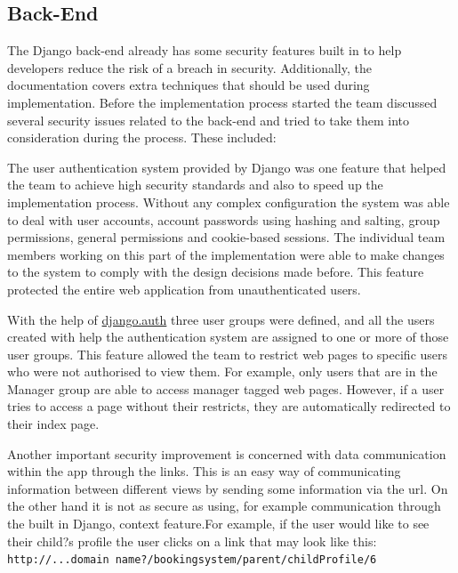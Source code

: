 \documentclass{l3proj}
\begin{document}
\subsection{Back-End}
The Django back-end already has some security features built in to help developers reduce the risk of a breach in security. Additionally, the documentation covers extra techniques that should be used during implementation. Before the implementation process started the team discussed several security issues related to the back-end and tried to take them into consideration during the process. These included:\\
\par
The user authentication system provided by Django was one feature that helped the team to achieve high security standards and also to speed up the implementation process. Without any complex configuration the system was able to deal with user accounts, account passwords using hashing and salting, group permissions, general permissions and cookie-based sessions. The individual team members working on this part of the implementation were able to make changes to the system to comply with the design decisions made before. This feature protected the entire web application from unauthenticated users.\\
\par
With the help of \underline{django.auth} three user groups were defined, and all the users created with help the authentication system are assigned to one or more of those user groups. This feature allowed the team to restrict web pages to specific users who were not authorised to view them. For example, only users that are in the Manager group are able to access manager tagged web pages. However, if a user tries to access a page without their restricts, they are automatically redirected to their index page. \\
\par
Another important security improvement is concerned with data communication within the app through the links. This is an easy way of communicating information between different views by sending some information via the url. On the other hand it is not as secure as using, for example communication through the built in Django, context feature.For example, if the user would like to see their child?s profile the user clicks on a link that may look like this:\\
\texttt{http://...domain name?/bookingsystem/parent/childProfile/6}
\end{document}
